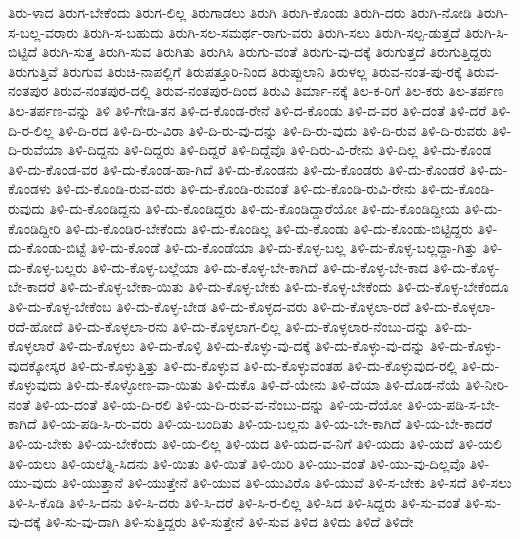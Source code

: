 {ತಿರು-ಳಾದ
ತಿರುಗ-ಬೇಕೆಂದು
ತಿರುಗ-ಲಿಲ್ಲ
ತಿರುಗಾಡಲು
ತಿರುಗಿ
ತಿರುಗಿ-ಕೊಂಡು
ತಿರುಗಿ-ದರು
ತಿರುಗಿ-ನೋಡಿ
ತಿರುಗಿ-ಸ-ಬಲ್ಲ-ವರಾರು
ತಿರುಗಿ-ಸ-ಬಹುದು
ತಿರುಗಿ-ಸಲ-ಸಮರ್ಥ-ರಾಗು-ವರು
ತಿರುಗಿ-ಸಲು
ತಿರುಗಿ-ಸಲ್ಪ-ಡುತ್ತದೆ
ತಿರುಗಿ-ಸಿ-ಬಿಟ್ಟಿದೆ
ತಿರುಗಿ-ಸುತ್ತ
ತಿರುಗಿ-ಸುವ
ತಿರುಗಿತು
ತಿರುಗಿಸಿ
ತಿರುಗು-ವಂತೆ
ತಿರುಗು-ವು-ದಕ್ಕೆ
ತಿರುಗುತ್ತದೆ
ತಿರುಗುತ್ತಿದ್ದರು
ತಿರುಗುತ್ತಿವೆ
ತಿರುಗುವ
ತಿರುಚಿ-ನಾಪಲ್ಲಿಗೆ
ತಿರುಪತ್ತೂರಿ-ನಿಂದ
ತಿರುಪ್ಪುಲಾನಿ
ತಿರುಳಲ್ಲ
ತಿರುವ-ನಂತ-ಪು-ರಕ್ಕೆ
ತಿರುವ-ನಂತಪುರ
ತಿರುವ-ನಂತಪುರ-ದಲ್ಲಿ
ತಿರುವ-ನಂತಪುರ-ದಿಂದ
ತಿರುವಿ
ತಿರ್ಮಾ-ನಕ್ಕೆ
ತಿಲ-ಕ-ರಿಗೆ
ತಿಲ-ಕರು
ತಿಲ-ತರ್ಪಣ
ತಿಲ-ತರ್ಪಣ-ವನ್ನು
ತಿಳಿ
ತಿಳಿ-ಗೇಡಿ-ತನ
ತಿಳಿ-ದ-ಕೊಂಡ-ರೇನೆ
ತಿಳಿ-ದ-ಕೊಂಡು
ತಿಳಿ-ದ-ವರ
ತಿಳಿ-ದಂತೆ
ತಿಳಿ-ದರೆ
ತಿಳಿ-ದಿ-ರ-ಲಿಲ್ಲ
ತಿಳಿ-ದಿ-ರದ
ತಿಳಿ-ದಿ-ರು-ವಿರಾ
ತಿಳಿ-ದಿ-ರು-ವು-ದನ್ನು
ತಿಳಿ-ದಿ-ರು-ವುದು
ತಿಳಿ-ದಿ-ರುವ
ತಿಳಿ-ದಿ-ರುವರು
ತಿಳಿ-ದಿ-ರುವೆಯಾ
ತಿಳಿ-ದಿದ್ದನು
ತಿಳಿ-ದಿದ್ದರು
ತಿಳಿ-ದಿದ್ದರೆ
ತಿಳಿ-ದಿದ್ದೆವೊ
ತಿಳಿ-ದಿರು-ವಿ-ರೇನು
ತಿಳಿ-ದಿಲ್ಲ
ತಿಳಿ-ದು-ಕೊಂಡ
ತಿಳಿ-ದು-ಕೊಂಡ-ವರ
ತಿಳಿ-ದು-ಕೊಂಡ-ಹಾ-ಗಿದೆ
ತಿಳಿ-ದು-ಕೊಂಡನು
ತಿಳಿ-ದು-ಕೊಂಡರು
ತಿಳಿ-ದು-ಕೊಂಡರೆ
ತಿಳಿ-ದು-ಕೊಂಡಳು
ತಿಳಿ-ದು-ಕೊಂಡಿ-ರುವ-ವರು
ತಿಳಿ-ದು-ಕೊಂಡಿ-ರುವಂತೆ
ತಿಳಿ-ದು-ಕೊಂಡಿ-ರುವಿ-ರೇನು
ತಿಳಿ-ದು-ಕೊಂಡಿ-ರುವುದು
ತಿಳಿ-ದು-ಕೊಂಡಿದ್ದನು
ತಿಳಿ-ದು-ಕೊಂಡಿದ್ದರು
ತಿಳಿ-ದು-ಕೊಂಡಿದ್ದಾರೆಯೋ
ತಿಳಿ-ದು-ಕೊಂಡಿದ್ದೀಯ
ತಿಳಿ-ದು-ಕೊಂಡಿದ್ದೀರಿ
ತಿಳಿ-ದು-ಕೊಂಡಿರ-ಬೇಕೆಂದು
ತಿಳಿ-ದು-ಕೊಂಡಿಲ್ಲ
ತಿಳಿ-ದು-ಕೊಂಡು
ತಿಳಿ-ದು-ಕೊಂಡು-ಬಿಟ್ಟಿದ್ದರು
ತಿಳಿ-ದು-ಕೊಂಡು-ಬಿಟ್ಟೆ
ತಿಳಿ-ದು-ಕೊಂಡೆ
ತಿಳಿ-ದು-ಕೊಂಡೆಯಾ
ತಿಳಿ-ದು-ಕೊಳ್ಳ-ಬಲ್ಲ
ತಿಳಿ-ದು-ಕೊಳ್ಳ-ಬಲ್ಲದ್ದಾ-ಗಿತ್ತು
ತಿಳಿ-ದು-ಕೊಳ್ಳ-ಬಲ್ಲರು
ತಿಳಿ-ದು-ಕೊಳ್ಳ-ಬಲ್ಲೆಯಾ
ತಿಳಿ-ದು-ಕೊಳ್ಳ-ಬೇ-ಕಾಗಿದೆ
ತಿಳಿ-ದು-ಕೊಳ್ಳ-ಬೇ-ಕಾದ
ತಿಳಿ-ದು-ಕೊಳ್ಳ-ಬೇ-ಕಾದರೆ
ತಿಳಿ-ದು-ಕೊಳ್ಳ-ಬೇಕಾ-ಯಿತು
ತಿಳಿ-ದು-ಕೊಳ್ಳ-ಬೇಕು
ತಿಳಿ-ದು-ಕೊಳ್ಳ-ಬೇಕೆಂದು
ತಿಳಿ-ದು-ಕೊಳ್ಳ-ಬೇಕೆಂದೂ
ತಿಳಿ-ದು-ಕೊಳ್ಳ-ಬೇಕೆಂಬ
ತಿಳಿ-ದು-ಕೊಳ್ಳ-ಬೇಡ
ತಿಳಿ-ದು-ಕೊಳ್ಳದ-ವರು
ತಿಳಿ-ದು-ಕೊಳ್ಳಲಾ-ರದೆ
ತಿಳಿ-ದು-ಕೊಳ್ಳಲಾ-ರದೆ-ಹೋದೆ
ತಿಳಿ-ದು-ಕೊಳ್ಳಲಾ-ರನು
ತಿಳಿ-ದು-ಕೊಳ್ಳಲಾಗ-ಲಿಲ್ಲ
ತಿಳಿ-ದು-ಕೊಳ್ಳಲಾರ-ನೆಂಬು-ದನ್ನು
ತಿಳಿ-ದು-ಕೊಳ್ಳಲಾರೆ
ತಿಳಿ-ದು-ಕೊಳ್ಳಲು
ತಿಳಿ-ದು-ಕೊಳ್ಳಿ
ತಿಳಿ-ದು-ಕೊಳ್ಳು-ವು-ದಕ್ಕೆ
ತಿಳಿ-ದು-ಕೊಳ್ಳು-ವು-ದನ್ನು
ತಿಳಿ-ದು-ಕೊಳ್ಳು-ವುದಕ್ಕೋಸ್ಕರ
ತಿಳಿ-ದು-ಕೊಳ್ಳುತ್ತಿತ್ತು
ತಿಳಿ-ದು-ಕೊಳ್ಳುವ
ತಿಳಿ-ದು-ಕೊಳ್ಳುವಂತಹ
ತಿಳಿ-ದು-ಕೊಳ್ಳುವುದ-ರಲ್ಲಿ
ತಿಳಿ-ದು-ಕೊಳ್ಳುವುದು
ತಿಳಿ-ದು-ಕೊಳ್ಳೋಣ-ವಾ-ಯಿತು
ತಿಳಿ-ದುಕೊ
ತಿಳಿ-ದೆ-ಯೇನು
ತಿಳಿ-ದೆಯಾ
ತಿಳಿ-ದೊಡ-ನೆಯೆ
ತಿಳಿ-ನೀರಿ-ನಂತೆ
ತಿಳಿ-ಯ-ದಂತೆ
ತಿಳಿ-ಯ-ದಿ-ರಲಿ
ತಿಳಿ-ಯ-ದಿ-ರುವ-ವ-ನೆಂಬು-ದನ್ನು
ತಿಳಿ-ಯ-ದೆಯೋ
ತಿಳಿ-ಯ-ಪಡಿ-ಸ-ಬೇ-ಕಾಗಿದೆ
ತಿಳಿ-ಯ-ಪಡಿ-ಸಿ-ರು-ವರು
ತಿಳಿ-ಯ-ಬಂದಿತು
ತಿಳಿ-ಯ-ಬಲ್ಲನು
ತಿಳಿ-ಯ-ಬೇ-ಕಾಗಿದೆ
ತಿಳಿ-ಯ-ಬೇ-ಕಾದರೆ
ತಿಳಿ-ಯ-ಬೇಕು
ತಿಳಿ-ಯ-ಬೇಕೆಂದು
ತಿಳಿ-ಯ-ಲಿಲ್ಲ
ತಿಳಿ-ಯದ
ತಿಳಿ-ಯದ-ವ-ನಿಗೆ
ತಿಳಿ-ಯದು
ತಿಳಿ-ಯದೆ
ತಿಳಿ-ಯಲಿ
ತಿಳಿ-ಯಲು
ತಿಳಿ-ಯಲೆತ್ನಿ-ಸಿದನು
ತಿಳಿ-ಯಿತು
ತಿಳಿ-ಯಿತೆ
ತಿಳಿ-ಯಿರಿ
ತಿಳಿ-ಯು-ವಂತೆ
ತಿಳಿ-ಯು-ವು-ದಿಲ್ಲವೊ
ತಿಳಿ-ಯು-ವುದು
ತಿಳಿ-ಯುತ್ತಾನೆ
ತಿಳಿ-ಯುತ್ತೇನೆ
ತಿಳಿ-ಯುವ
ತಿಳಿ-ಯುವಿರೊ
ತಿಳಿ-ಯುವೆ
ತಿಳಿ-ಸ-ಬೇಕು
ತಿಳಿ-ಸದೆ
ತಿಳಿ-ಸಲು
ತಿಳಿ-ಸಿ-ಕೊಡಿ
ತಿಳಿ-ಸಿ-ದನು
ತಿಳಿ-ಸಿ-ದರು
ತಿಳಿ-ಸಿ-ದರೆ
ತಿಳಿ-ಸಿ-ರ-ಲಿಲ್ಲ
ತಿಳಿ-ಸಿದ
ತಿಳಿ-ಸಿದ್ದರು
ತಿಳಿ-ಸು-ವಂತೆ
ತಿಳಿ-ಸು-ವು-ದಕ್ಕೆ
ತಿಳಿ-ಸು-ವು-ದಾಗಿ
ತಿಳಿ-ಸುತ್ತಿದ್ದರು
ತಿಳಿ-ಸುತ್ತೇನೆ
ತಿಳಿ-ಸುವ
ತಿಳಿದ
ತಿಳಿದು
ತಿಳಿದೆ
ತಿಳಿದೇ
}
